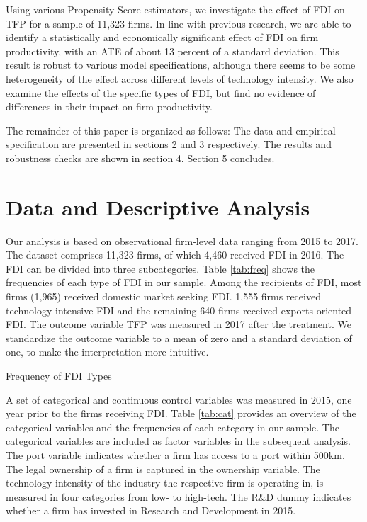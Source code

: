 \documentclass[a4paper,11pt]{scrartcl}
\begin{document}
Using various Propensity Score estimators, we investigate the effect of FDI on TFP for a sample of 11,323 firms. In line with previous research, we are able to identify a statistically and economically significant effect of FDI on firm productivity, with an ATE of about 13 percent of a standard deviation. This result is robust to various model specifications, although there seems to be some heterogeneity of the effect across different levels of technology intensity. We also examine the effects of the specific types of FDI, but find no evidence of differences in their impact on firm productivity.

The remainder of this paper is organized as follows: The data and empirical specification are presented in sections 2 and 3 respectively. The results and robustness checks are shown in section 4. Section 5 concludes.

\section{Data and Descriptive Analysis}
Our analysis is based on observational firm-level data ranging from 2015 to 2017. The dataset comprises 11,323 firms, of which 4,460 received FDI in 2016. The FDI can be divided into three subcategories. Table \ref{tab:freq} shows the frequencies of each type of FDI in our sample. Among the recipients of FDI, most firms (1,965) received domestic market seeking FDI. 1,555 firms received technology intensive FDI and the remaining 640 firms received exports oriented FDI. The outcome variable TFP was measured in 2017 after the treatment. We standardize the outcome variable to a mean of zero and a standard deviation of one, to make the interpretation more intuitive. 

\begin{table}[h!]
	\centering
	\caption{Frequency of FDI Types} 
	
\label{tab:freq}
\end{table}

A set of categorical and continuous control variables was measured in 2015, one year prior to the firms receiving FDI. Table \ref{tab:cat} provides an overview of the categorical variables and the frequencies of each category in our sample. The categorical variables are included as factor variables in the subsequent analysis. The port variable indicates whether a firm has access to a port within 500km. The legal ownership of a firm is captured in the ownership variable. The technology intensity of the industry the respective firm is operating in, is measured in four categories from low- to high-tech. The R\&D dummy indicates whether a firm has invested in Research and Development in 2015. \\
\end{document}
